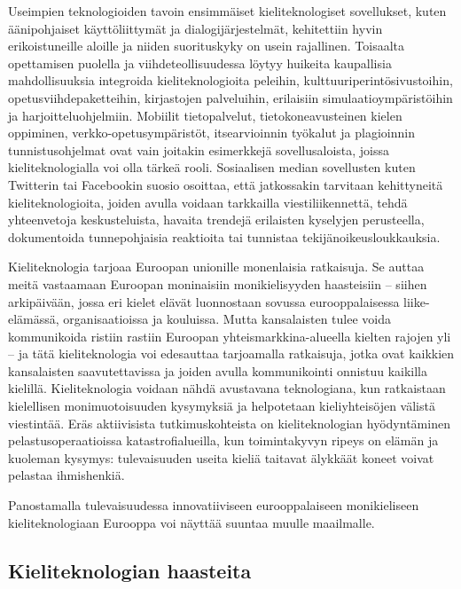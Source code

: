 \begin{multicols}{2}
Useimpien teknologioiden tavoin ensimmäiset kieliteknologiset sovellukset, kuten äänipohjaiset käyttöliittymät ja dialogijärjestelmät, kehitettiin hyvin erikoistuneille aloille ja niiden suorituskyky on usein rajallinen. Toisaalta opettamisen puolella ja viihdeteollisuudessa löytyy huikeita kaupallisia mahdollisuuksia integroida kieliteknologioita peleihin, kulttuuriperintösivustoihin, opetusviihdepaketteihin, kirjastojen palveluihin, erilaisiin simulaatioympäristöihin ja harjoitteluohjelmiin. Mobiilit tietopalvelut, tietokoneavusteinen kielen oppiminen, verkko-opetusympäristöt, itsearvioinnin työkalut ja plagioinnin tunnistusohjelmat ovat vain joitakin esimerkkejä sovellusaloista, joissa kieliteknologialla voi olla tärkeä rooli. Sosiaalisen median sovellusten kuten Twitterin tai Facebookin suosio osoittaa, että jatkossakin tarvitaan kehittyneitä kieliteknologioita, joiden avulla voidaan tarkkailla viestiliikennettä, tehdä yhteenvetoja keskusteluista, havaita trendejä erilaisten kyselyjen perusteella, dokumentoida tunnepohjaisia reaktioita tai tunnistaa tekijänoikeusloukkauksia.

Kieliteknologia tarjoaa Euroopan unionille monenlaisia ratkaisuja. Se auttaa meitä vastaamaan Euroopan moninaisiin monikielisyyden haasteisiin – siihen arkipäivään, jossa eri kielet elävät luonnostaan sovussa eurooppalaisessa liike-elämässä, organisaatioissa ja kouluissa. Mutta kansalaisten tulee voida kommunikoida ristiin rastiin Euroopan yhteismarkkina-alueella kielten rajojen yli -- ja tätä kieliteknologia voi edesauttaa tarjoamalla ratkaisuja, jotka ovat kaikkien kansalaisten saavutettavissa ja joiden avulla kommunikointi onnistuu kaikilla kielillä. Kieliteknologia voidaan nähdä avustavana teknologiana, kun ratkaistaan kielellisen monimuotoisuuden kysymyksiä ja helpotetaan kieliyhteisöjen välistä viestintää. Eräs aktiivisista tutkimuskohteista on kieliteknologian hyödyntäminen pelastusoperaatioissa katastrofialueilla, kun toimintakyvyn ripeys on elämän ja kuoleman kysymys: tulevaisuuden useita kieliä taitavat älykkäät koneet voivat pelastaa ihmishenkiä.

Panostamalla tulevaisuudessa innovatiiviseen eurooppalaiseen monikieliseen kieliteknologiaan Eurooppa voi näyttää suuntaa muulle maailmalle.

\subsection{Kieliteknologian haasteita}


\end{multicols}
